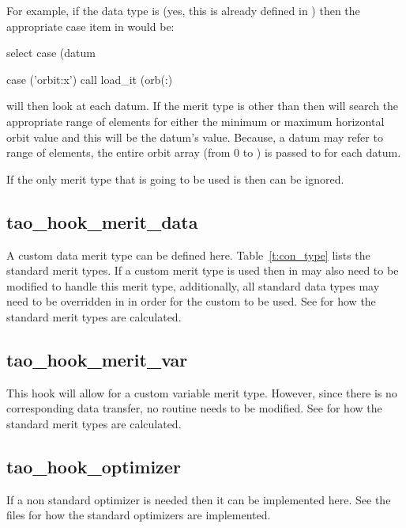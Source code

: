 For example, if the data type is  (yes, this is already defined in
\tao) then the appropriate case item in  would be:
\begin{example}
select case (datum%

case ('orbit:x')
  call load_it (orb(:)%
\end{example}
 will then look at each datum. If the merit type is other than
 then  will search the appropriate range of elements for
either the minimum or maximum horizontal orbit value and this will be the
datum's value. Because, a datum may refer to range of elements, the entire orbit
array (from 0 to ) is passed to  for each  datum.

If the only merit type that is going to be used is  then 
can be ignored.

\subsection{tao\_hook\_merit\_data}

A custom data merit type can be defined here. Table~\ref{t:con_type} lists the
standard merit types. If a custom merit type is used then  in
 may also need to be modified to handle this merit
type, additionally, all standard data types may need to be overridden in 
 in order for the custom  to be used.
See  for how the standard merit types are calculated.

\subsection{tao\_hook\_merit\_var}

This hook will allow for a custom variable merit type. However, since
there is no corresponding data transfer, no  routine needs to be modified.
See  for how the standard merit types are calculated.

\subsection{tao\_hook\_optimizer}

If a non standard optimizer is needed then it can be implemented here. See the
 files for how the standard optimizers are
implemented.

